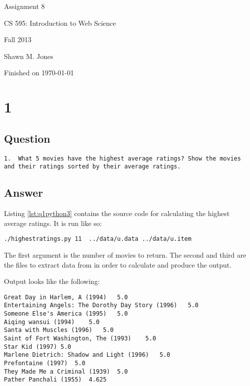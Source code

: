 \documentclass[letterpaper,11pt]{article}
\begin{document}
\begin{titlepage}

\begin{center}

\Huge{Assignment 8}

\Large{CS 595:  Introduction to Web Science}

\Large{Fall 2013}

\Large{Shawn M. Jones}

\Large Finished on \today

\end{center}

\end{titlepage}

\newpage


\newpage
\section*{1}

\subsection*{Question}

\begin{verbatim}
1.  What 5 movies have the highest average ratings? Show the movies
and their ratings sorted by their average ratings.
\end{verbatim}

\newpage
\subsection*{Answer}

Listing \ref{lst:q1python3} contains the source code for calculating the highest average ratings.  It is run like so:
\begin{lstlisting}[frame=single]
./highestratings.py 11  ../data/u.data ../data/u.item
\end{lstlisting}

The first argument is the number of movies to return.  The second and third are the files to extract data from in order to calculate and produce the output.

Output looks like the following:
\begin{lstlisting}[frame=single]
Great Day in Harlem, A (1994)	5.0
Entertaining Angels: The Dorothy Day Story (1996)	5.0
Someone Else's America (1995)	5.0
Aiqing wansui (1994)	5.0
Santa with Muscles (1996)	5.0
Saint of Fort Washington, The (1993)	5.0
Star Kid (1997)	5.0
Marlene Dietrich: Shadow and Light (1996) 	5.0
Prefontaine (1997)	5.0
They Made Me a Criminal (1939)	5.0
Pather Panchali (1955)	4.625
\end{lstlisting}
\end{document}
